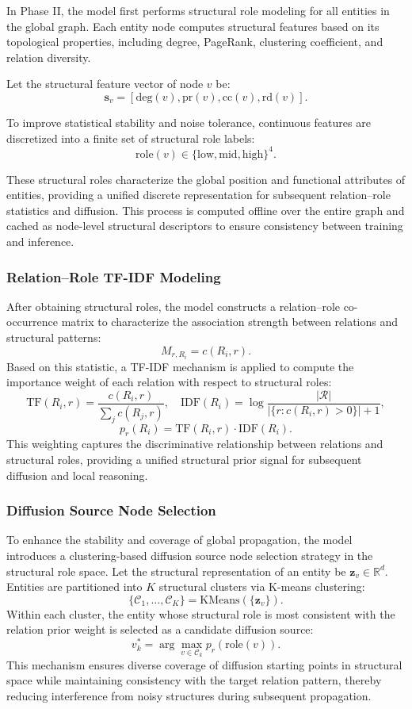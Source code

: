 \documentclass[preprint,12pt]{elsarticle}
\begin{document}
In Phase II, the model first performs structural role modeling for all entities in the global graph. Each entity node computes structural features based on its topological properties, including degree, PageRank, clustering coefficient, and relation diversity.

Let the structural feature vector of node $v$ be:
\[
\mathbf{s}_v=[\text{deg}(v),\text{pr}(v),\text{cc}(v),\text{rd}(v)].
\]

To improve statistical stability and noise tolerance, continuous features are discretized into a finite set of structural role labels:
\[
\text{role}(v)\in\{\text{low},\text{mid},\text{high}\}^4.
\]

These structural roles characterize the global position and functional attributes of entities, providing a unified discrete representation for subsequent relation–role statistics and diffusion. This process is computed offline over the entire graph and cached as node-level structural descriptors to ensure consistency between training and inference.
\subsubsection{Relation–Role TF-IDF Modeling}
After obtaining structural roles, the model constructs a relation–role co-occurrence matrix to characterize the association strength between relations and structural patterns:
\[
M_{r,R_i}=c(R_i,r).
\]
Based on this statistic, a TF-IDF mechanism is applied to compute the importance weight of each relation with respect to structural roles:
\[
\mathrm{TF}(R_i,r)=\frac{c(R_i,r)}{\sum_j c(R_j,r)}, \quad
\mathrm{IDF}(R_i)=\log\frac{|\mathcal{R}|}{|\{r:c(R_i,r)>0\}|+1},
\]
\[
p_r(R_i)=\mathrm{TF}(R_i,r)\cdot\mathrm{IDF}(R_i).
\]
This weighting captures the discriminative relationship between relations and structural roles, providing a unified structural prior signal for subsequent diffusion and local reasoning.
\subsubsection{Diffusion Source Node Selection}
To enhance the stability and coverage of global propagation, the model introduces a clustering-based diffusion source node selection strategy in the structural role space. Let the structural representation of an entity be $\mathbf{z}_v \in \mathbb{R}^d$. Entities are partitioned into $K$ structural clusters via K-means clustering:
\[
\{\mathcal{C}_1,\dots,\mathcal{C}_K\}=\text{KMeans}(\{\mathbf{z}_v\}).
\]
Within each cluster, the entity whose structural role is most consistent with the relation prior weight is selected as a candidate diffusion source:
\[
v_k^\ast=\arg\max_{v\in\mathcal{C}_k} p_r(\text{role}(v)).
\]
This mechanism ensures diverse coverage of diffusion starting points in structural space while maintaining consistency with the target relation pattern, thereby reducing interference from noisy structures during subsequent propagation.
\end{document}
